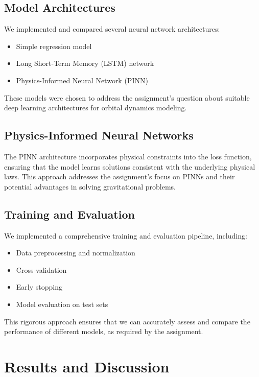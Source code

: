 \documentclass[12pt,a4paper]{article}
\begin{document}
\subsection{Model Architectures}
We implemented and compared several neural network architectures:

\begin{itemize}
    \item Simple regression model
    \item Long Short-Term Memory (LSTM) network
    \item Physics-Informed Neural Network (PINN)
\end{itemize}

These models were chosen to address the assignment's question about suitable deep learning architectures for orbital dynamics modeling.

\subsection{Physics-Informed Neural Networks}
The PINN architecture incorporates physical constraints into the loss function, ensuring that the model learns solutions consistent with the underlying physical laws. This approach addresses the assignment's focus on PINNs and their potential advantages in solving gravitational problems.

\subsection{Training and Evaluation}
We implemented a comprehensive training and evaluation pipeline, including:

\begin{itemize}
    \item Data preprocessing and normalization
    \item Cross-validation
    \item Early stopping
    \item Model evaluation on test sets
\end{itemize}

This rigorous approach ensures that we can accurately assess and compare the performance of different models, as required by the assignment.

\section{Results and Discussion}
\label{sec:results}
\end{document}
